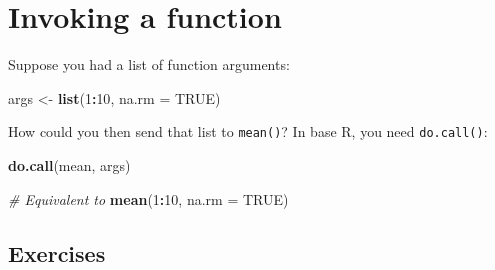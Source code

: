 \documentclass[]{book}
\newenvironment{Shaded}{\begin{snugshade}}{\end{snugshade}}
\newcommand{\KeywordTok}[1]{\textcolor[rgb]{0.13,0.29,0.53}{\textbf{#1}}}
\newcommand{\DataTypeTok}[1]{\textcolor[rgb]{0.13,0.29,0.53}{#1}}
\newcommand{\DecValTok}[1]{\textcolor[rgb]{0.00,0.00,0.81}{#1}}
\newcommand{\StringTok}[1]{\textcolor[rgb]{0.31,0.60,0.02}{#1}}
\newcommand{\CommentTok}[1]{\textcolor[rgb]{0.56,0.35,0.01}{\textit{#1}}}
\newcommand{\OtherTok}[1]{\textcolor[rgb]{0.56,0.35,0.01}{#1}}
\newcommand{\OperatorTok}[1]{\textcolor[rgb]{0.81,0.36,0.00}{\textbf{#1}}}
\newcommand{\NormalTok}[1]{#1}
\theoremstyle{definition}
\theoremstyle{definition}
\theoremstyle{definition}
\theoremstyle{remark}
\begin{document}
\section{Invoking a function}\label{invoking-a-function}

Suppose you had a list of function arguments:

\begin{Shaded}
\begin{Highlighting}[]
\NormalTok{args <-}\StringTok{ }\KeywordTok{list}\NormalTok{(}\DecValTok{1}\OperatorTok{:}\DecValTok{10}\NormalTok{, }\DataTypeTok{na.rm =} \OtherTok{TRUE}\NormalTok{)}
\end{Highlighting}
\end{Shaded}

How could you then send that list to \texttt{mean()}? In base R, you
need \texttt{do.call()}:

\begin{Shaded}
\begin{Highlighting}[]
\KeywordTok{do.call}\NormalTok{(mean, args)}
\end{Highlighting}
\end{Shaded}

\begin{Shaded}
\begin{Highlighting}[]
\CommentTok{# Equivalent to}
\KeywordTok{mean}\NormalTok{(}\DecValTok{1}\OperatorTok{:}\DecValTok{10}\NormalTok{, }\DataTypeTok{na.rm =} \OtherTok{TRUE}\NormalTok{)}
\end{Highlighting}
\end{Shaded}

\subsection{Exercises}\label{exercises-5}
\end{document}
